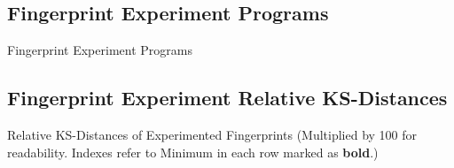 \newpage
\subsection*{Fingerprint Experiment Programs}
\FloatBarrier
\begin{table}[!ht]
	\centering
	
	\caption{Fingerprint Experiment Programs}
	\label{FingerprintApps}
\end{table}
\FloatBarrier

\subsection*{Fingerprint Experiment Relative KS-Distances}
\FloatBarrier
\begin{sidewaystable}[!ht]
	\footnotesize
	\centering
	
	\caption{
		Relative KS-Distances of Experimented Fingerprints (Multiplied by 100 for readability. Indexes refer to  
		Minimum in each row marked as \textbf{bold}.)
	}
	\label{ksdistances}
\end{sidewaystable}
\FloatBarrier